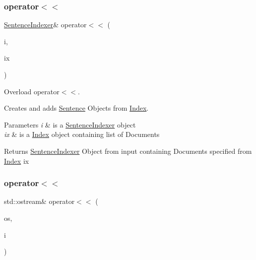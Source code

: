 \subsubsection{\texorpdfstring{operator$<$$<$}{operator<<}\hspace{0.1cm}{\footnotesize\ttfamily [2/3]}}
{\footnotesize\ttfamily \hyperlink{class_sentence_indexer}{Sentence\+Indexer}\& operator$<$$<$ (\begin{DoxyParamCaption}\item[{\hyperlink{class_sentence_indexer}{Sentence\+Indexer} \&}]{i,  }\item[{const \hyperlink{class_index}{Index} \&}]{ix }\end{DoxyParamCaption})\hspace{0.3cm}{\ttfamily [friend]}}



Overload operator$<$$<$. 

Creates and adds \hyperlink{class_sentence}{Sentence} Objects from \hyperlink{class_index}{Index}.


\begin{DoxyParams}{Parameters}
{\em i} & is a \hyperlink{class_sentence_indexer}{Sentence\+Indexer} object \\
\hline
{\em ix} & is a \hyperlink{class_index}{Index} object containing list of Documents \\
\hline
\end{DoxyParams}
\begin{DoxyReturn}{Returns}
\hyperlink{class_sentence_indexer}{Sentence\+Indexer} Object from input containing Documents specified from \hyperlink{class_index}{Index} ix 
\end{DoxyReturn}
\mbox{\label{class_sentence_indexer_a8508e3ba7ddd0063c317c20295354e03}} 
\subsubsection{\texorpdfstring{operator$<$$<$}{operator<<}\hspace{0.1cm}{\footnotesize\ttfamily [3/3]}}
{\footnotesize\ttfamily std\+::ostream\& operator$<$$<$ (\begin{DoxyParamCaption}\item[{std\+::ostream \&}]{os,  }\item[{const \hyperlink{class_sentence_indexer}{Sentence\+Indexer} \&}]{i }\end{DoxyParamCaption})\hspace{0.3cm}{\ttfamily [friend]}}



